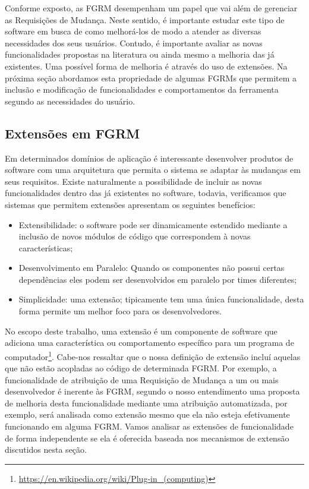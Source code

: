 Conforme exposto, as FGRM desempenham um papel que vai além de gerenciar as
Requisições de Mudança. Neste sentido, é importante estudar este tipo de
software em busca de como melhorá-los de modo a atender as diversas necessidades
dos seus usuários. Contudo, é importante avaliar as novas funcionalidades
propostas na li\-te\-ra\-tu\-ra ou ainda mesmo a melhoria das já existentes. Uma
possível forma de melhoria é através do uso de extensões. Na próxima seção
abordamos esta propriedade de algumas FGRMs que permitem a inclusão e
modificação de funcionalidades e comportamentos da ferramenta segundo as
necessidades do usuário.
\todoend{}

\subsection{Extensões em FGRM}
\label{subsec:manutencao_visao_geral_extensoes_fgrm}

Em determinados domínios de aplicação é interessante desenvolver produtos de
software com uma arquitetura que permita o sistema se adaptar às mudanças em
seus requisitos. Existe naturalmente a possibilidade de incluir as novas
funcionalidades dentro das já existentes no software, todavia, verificamos que
sistemas que permitem extensões apresentam os seguintes benefícios:

\begin{itemize}
	\item Extensibilidade: o software pode ser dinamicamente estendido mediante
		a inclusão de novos módulos de código que correspondem à novas
		características;
	\item Desenvolvimento em Paralelo: Quando os componentes não possui certas
		dependências eles podem ser desenvolvidos em paralelo por times
		diferentes;
	\item Simplicidade: uma  extensão; tipicamente tem uma única funcionalidade,
		desta forma permite um melhor foco para os desenvolvedores.
\end{itemize}

No escopo deste trabalho, uma extensão é um componente de software que adiciona
uma característica ou comportamento específico para um programa de
computador\footnote{\url{https://en.wikipedia.org/wiki/Plug-in\_(computing)}}.
Cabe-nos ressaltar que o nossa definição de extensão incluí aquelas que não
estão acopladas ao código de determinada FGRM\@. Por exemplo, a funcionalidade
de atribuição de uma Requisição de Mudança a um ou mais desenvolvedor é inerente
às FGRM, segundo o nosso entendimento uma proposta de melhoria desta
funcionalidade mediante uma atribuição automatizada, por exemplo, será analisada
como extensão mesmo que ela não esteja efetivamente funcionando em alguma
FGRM\@. Vamos a\-na\-li\-sar as extensões de funcionalidade de forma
independente se ela é oferecida baseada nos mecanismos de extensão discutidos
nesta seção.

